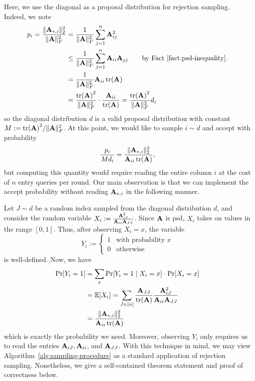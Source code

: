 Here, we use the diagonal as a proposal distribution for rejection sampling. Indeed, we note
\begin{align}
    \begin{split}
    p_i = \frac{\|\mathbf{A}_{*, i}\|^2_2}{\|\mathbf{A}\|^2_F} &= \frac{1}{\|\mathbf{A}\|^2_F}\sum_{j=1}^n \mathbf{A}_{ij}^2\\
    &\leq \frac{1}{\|\mathbf{A}\|^2_F}\sum_{j=1}^n\mathbf{A}_{ii}\mathbf{A}_{jj}\qquad\text{by Fact~\ref{fact:psd-inequality}.}\\
    &=\frac{1}{\|\mathbf{A}\|^2_F}\mathbf{A}_{ii}\tr(\mathbf{A})\\
    &=\frac{\tr(\mathbf{A})^2}{\|\mathbf{A}\|^2_F}\cdot\frac{\mathbf{A}_{ii}}{\tr(\mathbf{A})} = \frac{\tr(\mathbf{A})^2}{\|\mathbf{A}\|^2_F} d_i
    \end{split}
\end{align}
so the diagonal distribution $d$ is a valid proposal distribution with constant $M := \tr(\mathbf{A})^2/\|\mathbf{A}\|^2_F$. At this point, we would like to sample $i\sim d$ and accept with probability
\[\frac{p_i}{Md_i} = \frac{\|\mathbf{A}_{*, i}\|^2_2}{\mathbf{A}_{ii}\tr(\mathbf{A})},\]
but computing this quantity would require reading the entire column $i$ at the cost of $n$ entry queries per round. Our main observation is that we can implement the accept probability without reading $\mathbf{A}_{*, i}$ in the following manner.

Let $J\sim d$ be a random index sampled from the diagonal distribution $d$, and consider the random variable $X_i := \frac{\mathbf{A}_{iJ}^2}{\mathbf{A}_{ii}\mathbf{A}_{JJ}}$. Since $\mathbf{A}$ is psd, $X_i$ takes on values in the range $[0,1]$. Thus, after observing $X_i = x$, the variable
\[Y_i:= \begin{cases}
    1&\text{with probability $x$}\\
    0&\text{otherwise}
\end{cases}\]
is well-defined. Now, we have
\begin{align}
\begin{split}
    \Pr[Y_i = 1] &= \sum_x\Pr[Y_i = 1\mid X_i = x]\cdot \Pr[X_i = x]\\
    &=\mathbb{E}[X_i] = \sum_{J\in [n]}\frac{\mathbf{A}_{JJ}}{\tr(\mathbf{A})}\frac{\mathbf{A}_{iJ}^2}{\mathbf{A}_{ii}\mathbf{A}_{JJ}}\\
    &=\frac{\|\mathbf{A}_{*, i}\|^2_2}{\mathbf{A}_{ii}\tr(\mathbf{A})}
\end{split}
\end{align}
which is exactly the probability we need. Moreover, observing $Y_i$ only requires us to read the entries $\mathbf{A}_{iJ}, \mathbf{A}_{ii}$, and $\mathbf{A}_{JJ}$. With this technique in mind, we may view Algorithm~\ref{alg:sampling-procedure} as a standard application of rejection sampling. Nonetheless, we give a self-contained theorem statement and proof of correctness below. 

